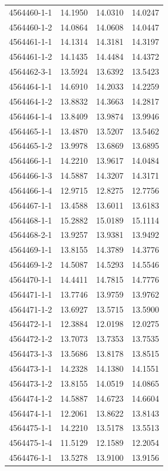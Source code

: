 \begin{longtable}{lrrr}
4564460-1-1 & 14.1950 & 14.0310 & 14.0247 \\
4564460-1-2 & 14.0864 & 14.0608 & 14.0447 \\
4564461-1-1 & 14.1314 & 14.3181 & 14.3197 \\
4564461-1-2 & 14.1435 & 14.4484 & 14.4372 \\
4564462-3-1 & 13.5924 & 13.6392 & 13.5423 \\
4564464-1-1 & 14.6910 & 14.2033 & 14.2259 \\
4564464-1-2 & 13.8832 & 14.3663 & 14.2817 \\
4564464-1-4 & 13.8409 & 13.9874 & 13.9946 \\
4564465-1-1 & 13.4870 & 13.5207 & 13.5462 \\
4564465-1-2 & 13.9978 & 13.6869 & 13.6895 \\
4564466-1-1 & 14.2210 & 13.9617 & 14.0484 \\
4564466-1-3 & 14.5887 & 14.3207 & 14.3171 \\
4564466-1-4 & 12.9715 & 12.8275 & 12.7756 \\
4564467-1-1 & 13.4588 & 13.6011 & 13.6183 \\
4564468-1-1 & 15.2882 & 15.0189 & 15.1114 \\
4564468-2-1 & 13.9257 & 13.9381 & 13.9492 \\
4564469-1-1 & 13.8155 & 14.3789 & 14.3776 \\
4564469-1-2 & 14.5087 & 14.5293 & 14.5546 \\
4564470-1-1 & 14.4411 & 14.7815 & 14.7776 \\
4564471-1-1 & 13.7746 & 13.9759 & 13.9762 \\
4564471-1-2 & 13.6927 & 13.5715 & 13.5900 \\
4564472-1-1 & 12.3884 & 12.0198 & 12.0275 \\
4564472-1-2 & 13.7073 & 13.7353 & 13.7535 \\
4564473-1-3 & 13.5686 & 13.8178 & 13.8515 \\
4564473-1-1 & 14.2328 & 14.1380 & 14.1551 \\
4564473-1-2 & 13.8155 & 14.0519 & 14.0865 \\
4564474-1-2 & 14.5887 & 14.6723 & 14.6604 \\
4564474-1-1 & 12.2061 & 13.8622 & 13.8143 \\
4564475-1-1 & 14.2210 & 13.5178 & 13.5513 \\
4564475-1-4 & 11.5129 & 12.1589 & 12.2054 \\
4564476-1-1 & 13.5278 & 13.9100 & 13.9156 \\

\end{longtable}
